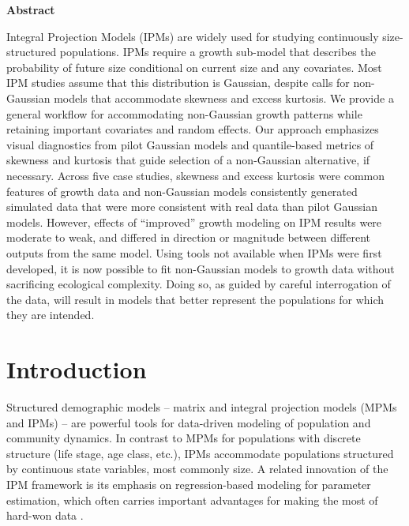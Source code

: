 \documentclass[12pt]{article}
\begin{document}
\begin{spacing}{1.9}
\linenumbers
\noindent 
\textbf{\large{Abstract}} 

Integral Projection Models (IPMs) are widely used for studying continuously size-structured populations. 
IPMs require a growth sub-model that describes the probability of future size conditional on current size and any covariates. 
Most IPM studies assume that this distribution is Gaussian, despite calls for non-Gaussian models that accommodate skewness and excess kurtosis. 
We provide a general workflow for accommodating non-Gaussian growth patterns while retaining important covariates and random effects. 
Our approach emphasizes visual diagnostics from pilot Gaussian models and quantile-based metrics of skewness and kurtosis that guide selection of a non-Gaussian alternative, if necessary. 
Across five case studies, skewness and excess kurtosis were common features of growth data and non-Gaussian models consistently generated simulated data that were more consistent with real data than pilot Gaussian models. 
However, effects of ``improved'' growth modeling on IPM results were moderate to weak, and differed in direction or magnitude between different outputs from the same model. 
Using tools not available when IPMs were first developed, it is now possible to fit non-Gaussian models to growth data without sacrificing ecological complexity. 
Doing so, as guided by careful interrogation of the data, will result in models that better represent the populations for which they are intended. 


\newpage
\section{Introduction}

Structured demographic models -- matrix and integral projection models (MPMs and IPMs) -- are powerful tools for data-driven modeling of population and community dynamics. 
In contrast to MPMs for populations with discrete structure (life stage, age class, etc.), IPMs \citep{easterling2000size} accommodate populations structured by continuous state variables, most commonly size. 
A related innovation of the IPM framework is its emphasis on regression-based modeling for parameter estimation, which 
often carries important advantages for making the most of hard-won data \citep{ellner2022critical}.  


\end{spacing}
\end{document}
